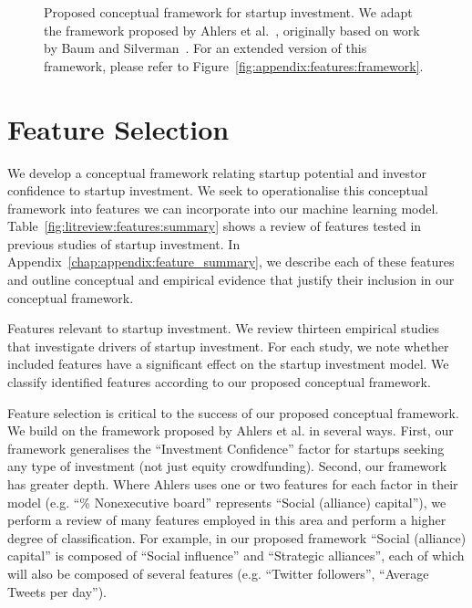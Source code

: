 \documentclass[../thesis/thesis.tex]{subfiles}
\begin{document}
\begin{refsection}
\begin{figure}[!htb]
    \centering
    
    \caption{Proposed conceptual framework for startup investment. We adapt the framework proposed by Ahlers et al.~\cite{ahlers2015}, originally based on work by Baum and Silverman~\cite{baum2004}. For an extended version of this framework, please refer to Figure~\ref{fig:appendix:features:framework}.}
    \label{fig:litreview:theory:framework}
\end{figure}

\section{Feature Selection}
\label{sec:litreview:features}

We develop a conceptual framework relating startup potential and investor confidence to startup investment. We seek to operationalise this conceptual framework into features we can incorporate into our machine learning model. Table~\ref{fig:litreview:features:summary} shows a review of features tested in previous studies of startup investment. In Appendix~\ref{chap:appendix:feature_summary}, we describe each of these features and outline conceptual and empirical evidence that justify their inclusion in our conceptual framework.

\begin{table}[!htb]
    \centering
    \scalebox{1}{
        
    }
    \caption{Features relevant to startup investment. We review thirteen empirical studies that investigate drivers of startup investment. For each study, we note whether included features have a significant effect on the startup investment model. We classify identified features according to our proposed conceptual framework.}
    \label{fig:litreview:features:summary}
\end{table}

Feature selection is critical to the success of our proposed conceptual framework. We build on the framework proposed by Ahlers et al. \cite{ahlers2015} in several ways. First, our framework generalises the ``Investment Confidence'' factor for startups seeking any type of investment (not just equity crowdfunding). Second, our framework has greater depth. Where Ahlers uses one or two features for each factor in their model (e.g. ``\% Nonexecutive board'' represents ``Social (alliance) capital''), we perform a review of many features employed in this area and perform a higher degree of classification. For example, in our proposed framework ``Social (alliance) capital'' is composed of ``Social influence'' and ``Strategic alliances'', each of which will also be composed of several features (e.g. ``Twitter followers'', ``Average Tweets per day'').


\end{refsection}
\end{document}
